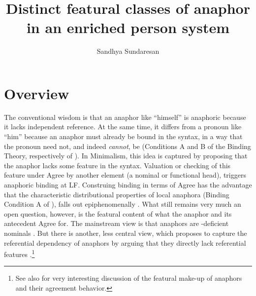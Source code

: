 \documentclass[output=paper, modfonts, nonflat]{langsci/langscibook}
\title{%
	Distinct featural classes of anaphor in an enriched person system}
\author{%
	Sandhya Sundaresan
	\affiliation{Universität Leipzig}
}
\begin{document}
\maketitle

\section{Overview}

The conventional wisdom is that an anaphor like ``himself'' is
anaphoric because it lacks independent reference. At the same time, it
differs from a pronoun like ``him'' because an anaphor must already be
bound in the syntax, in a way that the pronoun need not, and indeed
\textit{cannot}, be (Conditions A and B of the Binding Theory,
respectively of \citealt{Chomsky:1981}).  In Minimalism, this idea is
captured by proposing that the anaphor lacks some feature in the
syntax. Valuation or checking of this feature under Agree by another
element (a nominal or functional head), triggers anaphoric binding at
LF. Construing binding in terms of Agree has the advantage that the
characteristic distributional properties of local anaphora (Binding
Condition A of \citealt{Chomsky:1981}), falls out epiphenomenally
\citep{Hicks:2009}. What still remains very much an open question,
however, is the featural content of what the anaphor and its
antecedent Agree for. The mainstream view is that anaphors are
\ph-deficient nominals \citep{heinat:2008, kratzer:2009, reuland:2001,
  Reuland:2011, roorwyn:2011}. But there is another, less central
view, which proposes to capture the referential dependency of anaphors
by arguing that they directly lack referential features
\citep{adgerramchand:2005, Hicks:2009}.\footnote{See also  for very interesting discussion of the featural make-up of anaphors and their agreement behavior.}
\end{document}

